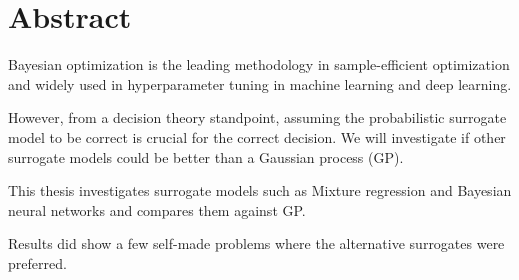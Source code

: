 \section*{Abstract}
Bayesian optimization is the leading methodology in sample-efficient optimization and
widely used in hyperparameter tuning in machine learning and deep learning. 

However, from a decision theory standpoint, assuming the probabilistic surrogate model to be correct
is crucial for the correct decision. We will investigate if other surrogate models could be better
than a Gaussian process (GP). 

This thesis investigates surrogate models such as Mixture regression and Bayesian neural networks
and compares them against GP. 

Results did show a few self-made problems where the alternative surrogates were preferred.





